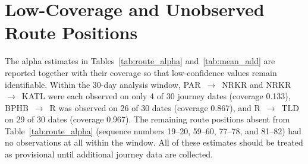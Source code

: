\documentclass[conference]{IEEEtran}
\begin{document}
\vspace{-6pt}
\section{Low-Coverage and Unobserved Route Positions}
\label{app:lowcov}

The alpha estimates in Tables~\ref{tab:route_alpha} and~\ref{tab:mean_add} are reported together with their coverage so that low-confidence values remain identifiable. Within the 30-day analysis window, PAR~$\rightarrow$~NRKR and NRKR~$\rightarrow$~KATL were each observed on only 4 of 30 journey dates (coverage 0.133), BPHB~$\rightarrow$~R was observed on 26 of 30 dates (coverage 0.867), and R~$\rightarrow$~TLD on 29 of 30 dates (coverage 0.967). The remaining route positions absent from Table~\ref{tab:route_alpha} (sequence numbers 19--20, 59--60, 77--78, and 81--82) had no observations at all within the window. All of these estimates should be treated as provisional until additional journey data are collected.
\end{document}
